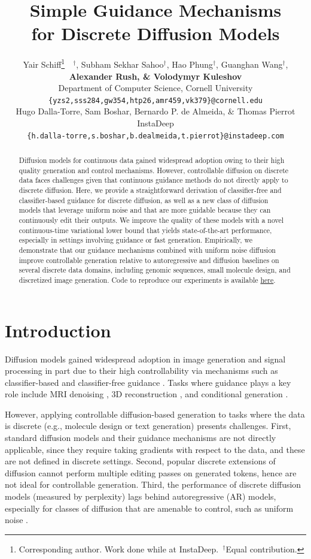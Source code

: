 \documentclass{article} %
\title{Simple Guidance Mechanisms\\for Discrete Diffusion Models}
\author{Yair Schiff\thanks{Corresponding author. Work done while at InstaDeep.~$^\dagger$Equal contribution.}~~$^\dagger$, Subham Sekhar Sahoo$^\dagger$,  Hao Phung$^\dagger$, Guanghan Wang$^\dagger$,
\\
\textbf{Alexander Rush, \& Volodymyr Kuleshov}\\
Department of Computer Science, Cornell University\\
\texttt{\{yzs2,sss284,gw354,htp26,amr459,vk379\}@cornell.edu} \\
\AND
Hugo Dalla-Torre, Sam Boshar, Bernardo P. de Almeida, \& Thomas Pierrot\\
InstaDeep\\
\texttt{\{h.dalla-torre,s.boshar,b.dealmeida,t.pierrot\}@instadeep.com}
}
\begin{document}
\maketitle

\begin{abstract}
Diffusion models for continuous data gained widespread adoption owing to their high quality generation and control mechanisms. However, controllable diffusion on discrete data faces challenges given that continuous guidance methods do not directly apply to discrete diffusion. Here, we provide a straightforward derivation of classifier-free and classifier-based guidance for discrete diffusion, as well as a new class of diffusion models that leverage uniform noise and that are more guidable because they can continuously edit their outputs. We improve the quality of these models with a novel continuous-time variational lower bound that yields state-of-the-art performance, especially in settings involving guidance or fast generation. Empirically, we demonstrate that our guidance mechanisms combined with uniform noise diffusion improve controllable generation relative to autoregressive and diffusion baselines on several discrete data domains, including genomic sequences, small molecule design, and discretized image generation. Code to reproduce our experiments is available \href{https://github.com/kuleshov-group/discrete-diffusion-guidance}{here}.
\end{abstract}

\section{Introduction}\label{sec:intro}

Diffusion models \citep{sohl2015deep,ho2020denoising} gained widespread adoption in image generation and signal processing in part due to their high controllability via mechanisms such as classifier-based \citep{dhariwal2021agn} and classifier-free guidance \citep{nichol2021glide, ho2022classifier}.
Tasks where guidance plays a key role include MRI denoising \citep{song2019generative}, 3D reconstruction \citep{poole2022dreamfusion,gao2024cat3dcreate3dmultiview}, and conditional generation \citep{saharia2022photorealistic, gokaslan2024commoncanvas}.

However, applying controllable diffusion-based generation to tasks where the data is discrete (e.g., molecule design or text generation) presents challenges.
First, standard diffusion models and their guidance mechanisms are not directly applicable, since they require taking gradients with respect to the data, and these are not defined in discrete settings. Second, popular discrete extensions of diffusion \citep{sahoo2024simple, shi2024simplified} cannot perform multiple editing passes on generated tokens, hence are not ideal for controllable generation. Third, the performance of discrete diffusion models (measured by perplexity) lags behind autoregressive (AR) models, especially for classes of diffusion that are amenable to control, such as uniform noise \citep{austin2021structured,lou2023discrete}. 
\end{document}
